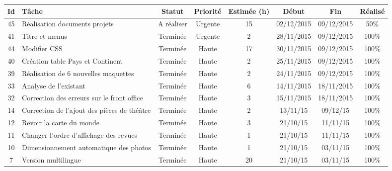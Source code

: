 \begin{tabular}{ | c | p{4cm} | c | c | c | c | c | c |  }
\hline 
Id & Tâche & Statut & Priorité & Estimée (h) & Début & Fin & Réalisé \\ \hline

45 & Réalisation documents projets & A réaliser & Urgente & 15 & 02/12/2015 &
09/12/2015 & 50\% \\ \hline
 41 & Titre et menus & Terminée & Urgente &  2 & 28/11/2015 & 09/12/2015 & 100\%
 \\
 \hline
	
44 & Modifier CSS & Terminée & Haute &  17 & 30/11/2015 & 09/12/2015 & 100\% \\
\hline
 40 & Création table Pays et Continent & Terminée & Haute &  2 & 25/11/2015 &
09/12/2015 & 100\% \\ \hline
 39 & Réalisation de 6 nouvelles maquettes & Terminée & Haute &  2 & 24/11/2015 &
 09/12/2015 & 100\% \\ \hline 
 33 & Analyse de l'existant & Terminée & Haute &  6 & 14/11/2015 & 18/11/2015 &
  100\% \\ \hline
 32 & Correction des erreurs sur le front office & Terminée & Haute & 3
	& 15/11/2015 & 18/11/2015 & 100\% \\ \hline
14 & Correction de l'ajout des pièces de théâtre & Terminée & Haute & 2 &
	13/11/15 & 09/12/15 & 100\%  \\ \hline
12 & Revoir la carte du monde & Terminée & Haute & 3 & 21/10/15 & 11/11/15 &
100\% \\ \hline
11 & Changer l'ordre d'affichage des revues & Terminée & Haute & 1 & 21/10/15
	& 11/11/15 & 100\% \\ \hline
10 & Dimensionnement automatique des photos & Terminée & Haute & 1 & 21/10/15
	& 03/11/15 & 100\% \\ \hline
7 & Version multilingue & Terminée & Haute & 20 & 21/10/15 & 03/11/15 & 100\% 
\\
\hline




\end{tabular}
